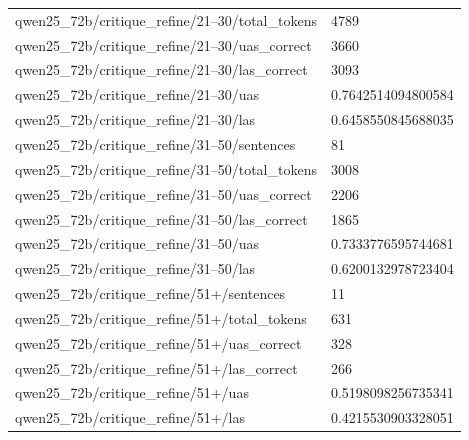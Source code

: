 \begin{tabular}{ll}
qwen25\_72b/critique\_refine/21–30/total\_tokens & 4789 \\
qwen25\_72b/critique\_refine/21–30/uas\_correct & 3660 \\
qwen25\_72b/critique\_refine/21–30/las\_correct & 3093 \\
qwen25\_72b/critique\_refine/21–30/uas & 0.7642514094800584 \\
qwen25\_72b/critique\_refine/21–30/las & 0.6458550845688035 \\
qwen25\_72b/critique\_refine/31–50/sentences & 81 \\
qwen25\_72b/critique\_refine/31–50/total\_tokens & 3008 \\
qwen25\_72b/critique\_refine/31–50/uas\_correct & 2206 \\
qwen25\_72b/critique\_refine/31–50/las\_correct & 1865 \\
qwen25\_72b/critique\_refine/31–50/uas & 0.7333776595744681 \\
qwen25\_72b/critique\_refine/31–50/las & 0.6200132978723404 \\
qwen25\_72b/critique\_refine/51+/sentences & 11 \\
qwen25\_72b/critique\_refine/51+/total\_tokens & 631 \\
qwen25\_72b/critique\_refine/51+/uas\_correct & 328 \\
qwen25\_72b/critique\_refine/51+/las\_correct & 266 \\
qwen25\_72b/critique\_refine/51+/uas & 0.5198098256735341 \\
qwen25\_72b/critique\_refine/51+/las & 0.4215530903328051 \\
\hline
\end{tabular}
